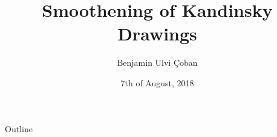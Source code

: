\documentclass[aspectratio=169]{beamer}
\title{Smoothening of Kandinsky Drawings}
\author{Benjamin Ulvi \c Coban}
\institute{Wilhelm Schickard Institute Tübingen}
\date{7th of August, 2018}
\begin{document}
\begin{frame}
  \titlepage
\end{frame}

\begin{frame}{Outline}
	\tableofcontents
\end{frame}
\end{document}
